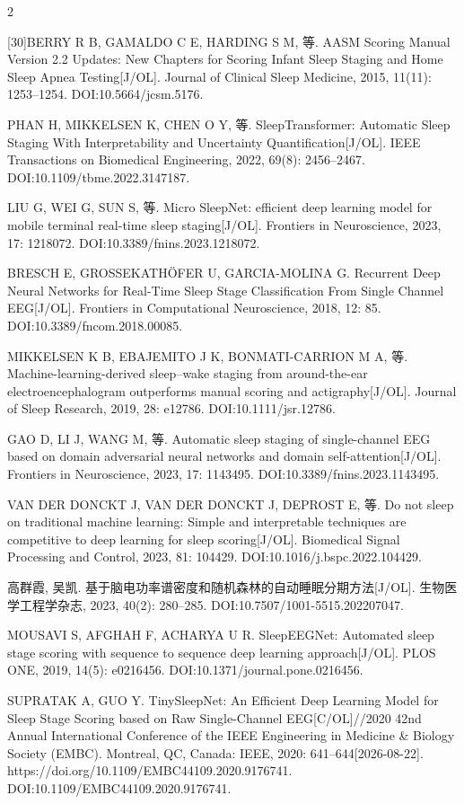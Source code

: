 \documentclass[UTF8,zihao=5,fontset=none]{ctexart}
\begin{document}
\begin{multicols}{2}
{[30]\quad BERRY R B, GAMALDO C E, HARDING S M, 等. AASM Scoring Manual Version 2.2 Updates: New Chapters for Scoring Infant Sleep Staging and Home Sleep Apnea Testing[J/OL]. Journal of Clinical Sleep Medicine, 2015, 11(11): 1253--1254. DOI:10.5664/jcsm.5176.\par
[31]\quad PHAN H, MIKKELSEN K, CHEN O Y, 等. SleepTransformer: Automatic Sleep Staging With Interpretability and Uncertainty Quantification[J/OL]. IEEE Transactions on Biomedical Engineering, 2022, 69(8): 2456--2467. DOI:10.1109/tbme.2022.3147187.\par
[32]\quad LIU G, WEI G, SUN S, 等. Micro SleepNet: efficient deep learning model for mobile terminal real-time sleep staging[J/OL]. Frontiers in Neuroscience, 2023, 17: 1218072. DOI:10.3389/fnins.2023.1218072.\par
[33]\quad BRESCH E, GROSSEKATHÖFER U, GARCIA-MOLINA G. Recurrent Deep Neural Networks for Real-Time Sleep Stage Classification From Single Channel EEG[J/OL]. Frontiers in Computational Neuroscience, 2018, 12: 85. DOI:10.3389/fncom.2018.00085.\par
[34]\quad MIKKELSEN K B, EBAJEMITO J K, BONMATI-CARRION M A, 等. Machine-learning-derived sleep–wake staging from around-the-ear electroencephalogram outperforms manual scoring and actigraphy[J/OL]. Journal of Sleep Research, 2019, 28: e12786. DOI:10.1111/jsr.12786.\par
[35]\quad GAO D, LI J, WANG M, 等. Automatic sleep staging of single-channel EEG based on domain adversarial neural networks and domain self-attention[J/OL]. Frontiers in Neuroscience, 2023, 17: 1143495. DOI:10.3389/fnins.2023.1143495.\par
[36]\quad VAN DER DONCKT J, VAN DER DONCKT J, DEPROST E, 等. Do not sleep on traditional machine learning: Simple and interpretable techniques are competitive to deep learning for sleep scoring[J/OL]. Biomedical Signal Processing and Control, 2023, 81: 104429. DOI:10.1016/j.bspc.2022.104429.\par
[37]\quad 高群霞, 吴凯. 基于脑电功率谱密度和随机森林的自动睡眠分期方法[J/OL]. 生物医学工程学杂志, 2023, 40(2): 280--285. DOI:10.7507/1001-5515.202207047.\par
[38]\quad MOUSAVI S, AFGHAH F, ACHARYA U R. SleepEEGNet: Automated sleep stage scoring with sequence to sequence deep learning approach[J/OL]. PLOS ONE, 2019, 14(5): e0216456. DOI:10.1371/journal.pone.0216456.\par
[39]\quad SUPRATAK A, GUO Y. TinySleepNet: An Efficient Deep Learning Model for Sleep Stage Scoring based on Raw Single-Channel EEG[C/OL]//2020 42nd Annual International Conference of the IEEE Engineering in Medicine \& Biology Society (EMBC). Montreal, QC, Canada: IEEE, 2020: 641--644[2026-08-22]. https://doi.org/10.1109/EMBC44109.2020.9176741. DOI:10.1109/EMBC44109.2020.9176741.\par
}
\end{multicols}
\end{document}
